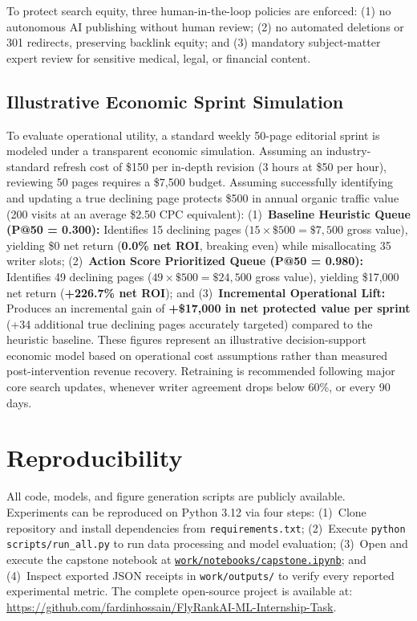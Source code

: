 \documentclass[conference]{IEEEtran}
\begin{document}
To protect search equity, three human-in-the-loop policies are enforced: (1) no autonomous AI publishing without human review; (2) no automated deletions or 301 redirects, preserving backlink equity; and (3) mandatory subject-matter expert review for sensitive medical, legal, or financial content.

\subsection{Illustrative Economic Sprint Simulation}
To evaluate operational utility, a standard weekly 50-page editorial sprint is modeled under a transparent economic simulation. Assuming an industry-standard refresh cost of \$150 per in-depth revision (3 hours at \$50 per hour), reviewing 50 pages requires a \$7,500 budget. Assuming successfully identifying and updating a true declining page protects \$500 in annual organic traffic value (200 visits at an average \$2.50 CPC equivalent):
(1)~\textbf{Baseline Heuristic Queue (P@50 = 0.300):} Identifies 15 declining pages ($15 \times \$500 = \$7,500$ gross value), yielding \$0 net return (\textbf{0.0\% net ROI}, breaking even) while misallocating 35 writer slots;
(2)~\textbf{Action Score Prioritized Queue (P@50 = 0.980):} Identifies 49 declining pages ($49 \times \$500 = \$24,500$ gross value), yielding \$17,000 net return (\textbf{+226.7\% net ROI}); and
(3)~\textbf{Incremental Operational Lift:} Produces an incremental gain of \textbf{+\$17,000 in net protected value per sprint} (+34 additional true declining pages accurately targeted) compared to the heuristic baseline.
These figures represent an illustrative decision-support economic model based on operational cost assumptions rather than measured post-intervention revenue recovery. Retraining is recommended following major core search updates, whenever writer agreement drops below 60\%, or every 90 days.

\section{Reproducibility}
All code, models, and figure generation scripts are publicly available. Experiments can be reproduced on Python 3.12 via four steps:
(1)~Clone repository and install dependencies from \texttt{requirements.txt};
(2)~Execute \texttt{python scripts/run\_all.py} to run data processing and model evaluation;
(3)~Open and execute the capstone notebook at \href{https://colab.research.google.com/github/fardinhossain/FlyRankAI-ML-Internship-Task/blob/main/work/notebooks/capstone.ipynb?flush_cache=true}{\texttt{work/notebooks/capstone.ipynb}}; and
(4)~Inspect exported JSON receipts in \texttt{work/outputs/} to verify every reported experimental metric.
The complete open-source project is available at: \\
\url{https://github.com/fardinhossain/FlyRankAI-ML-Internship-Task}.
\end{document}
